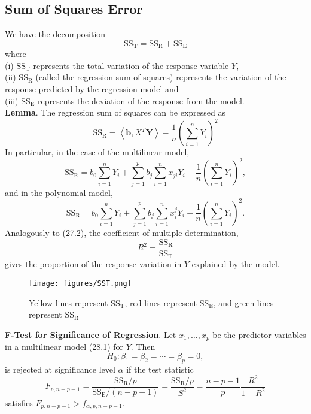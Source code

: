 \documentclass[a4paper,12pt]{article}
\begin{document}
\subsection{Sum of Squares Error}
We have the decomposition
$$
\mathrm{SS}_{\mathrm{T}}=\mathrm{SS}_{\mathrm{R}}+\mathrm{SS}_{\mathrm{E}}
$$
where\\
(i) $\mathrm{SS}_{\mathrm{T}}$ represents the total variation of the response variable $Y$,\\
(ii) $\mathrm{SS}_{\mathrm{R}}$ (called the regression sum of squares) represents the variation of the response predicted by the regression model and\\
(iii) $\mathrm{SS}_{\mathrm{E}}$ represents the deviation of the response from the model.\\
\textbf{Lemma}. The regression sum of squares can be expressed as
$$
\mathrm{SS}_{\mathrm{R}}=\left\langle\boldsymbol{b}, X^T \boldsymbol{Y}\right\rangle-\frac{1}{n}\left(\sum_{i=1}^n Y_i\right)^2
$$
In particular, in the case of the multilinear model,
$$
\mathrm{SS}_{\mathrm{R}}=b_0 \sum_{i=1}^n Y_i+\sum_{j=1}^p b_j \sum_{i=1}^n x_{j i} Y_i-\frac{1}{n}\left(\sum_{i=1}^n Y_i\right)^2,
$$
and in the polynomial model,
$$
\mathrm{SS}_{\mathrm{R}}=b_0 \sum_{i=1}^n Y_i+\sum_{j=1}^p b_j \sum_{i=1}^n x_i^j Y_i-\frac{1}{n}\left(\sum_{i=1}^n Y_i\right)^2 .
$$
Analogously to (27.2), the coefficient of multiple determination,
$$
R^2=\frac{\mathrm{SS}_{\mathrm{R}}}{\mathrm{SS}_{\mathrm{T}}}
$$
gives the proportion of the response variation in $Y$ explained by the model.\\
\begin{figure}[h] 
    \centering
    \texttt{[image: figures/SST.png]} 
    \caption{Yellow lines represent $\mathrm{SS}_{\mathrm{T}}$, red lines represent $\mathrm{SS}_{\mathrm{E}}$, and green lines represent $\mathrm{SS}_{\mathrm{R}}$}
\end{figure}
\textbf{F-Test for Significance of Regression}. Let $x_1, \ldots, x_p$ be the predictor variables in a multilinear model (28.1) for $Y$. Then
$$
H_0: \beta_1=\beta_2=\cdots=\beta_p=0,
$$
is rejected at significance level $\alpha$ if the test statistic
$$
F_{p, n-p-1}=\frac{\mathrm{SS}_{\mathrm{R}} / p}{\mathrm{SS}_{\mathrm{E}} /(n-p-1)}=\frac{\mathrm{SS}_{\mathrm{R}} / p}{S^2} = \dfrac{n-p-1}{p} \dfrac{R^2}{1-R^2}
$$
satisfies $F_{p, n-p-1}>f_{\alpha, p, n-p-1}$.
\end{document}
